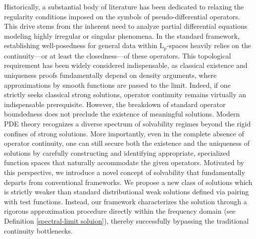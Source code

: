 \documentclass[11pt,reqno]{amsart}
\theoremstyle{definition}
\theoremstyle{remark}
\numberwithin{equation}{section}
\begin{document}
Historically, a substantial body of literature has been dedicated to relaxing the regularity conditions imposed on the symbols of pseudo-differential operators. 
This drive stems from the inherent need to analyze partial differential equations modeling highly irregular or singular phenomena. In the standard framework, establishing well-posedness for general data within $\mathrm{L}_p$-spaces heavily relies on the continuity—or at least the closedness—of these operators. 
This topological requirement has been widely considered indispensable, as classical existence and uniqueness proofs fundamentally depend on density arguments, where approximations by smooth functions are passed to the limit. 
Indeed, if one strictly seeks classical strong solutions, operator continuity remains virtually an indispensable prerequisite.
However, the breakdown of standard operator boundedness does not preclude the existence of meaningful solutions. 
Modern PDE theory recognizes a diverse spectrum of solvability regimes beyond the rigid confines of strong solutions. 
More importantly, even in the complete absence of operator continuity, one can still secure both the existence and the uniqueness of solutions by carefully constructing and identifying appropriate, specialized function spaces that naturally accommodate the given operators.
Motivated by this perspective, we introduce a novel concept of solvability that fundamentally departs from conventional frameworks. 
We propose a new class of solutions which is strictly weaker than standard distributional weak solutions defined via pairing with test functions. 
Instead, our framework characterizes the solution through a rigorous approximation procedure directly within the frequency domain (see Definition \ref{spectral-limit soluion}), thereby successfully bypassing the traditional continuity bottlenecks.
\end{document}
